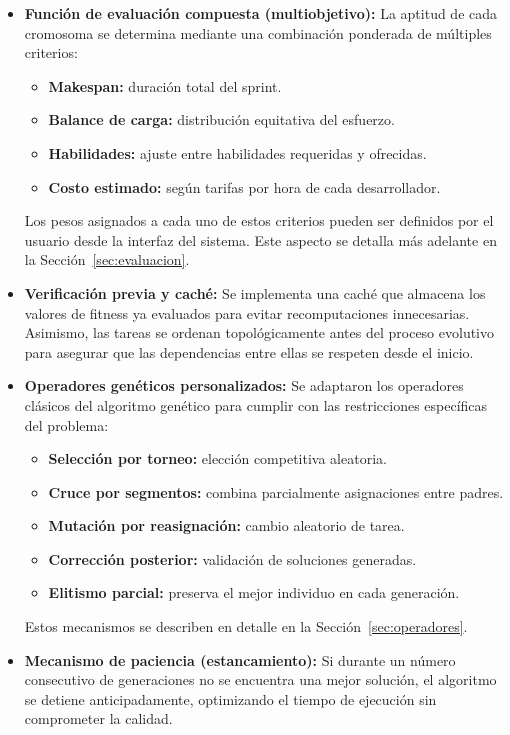 \begin{itemize}
    \item \textbf{Función de evaluación compuesta (multiobjetivo):}  
La aptitud de cada cromosoma se determina mediante una combinación ponderada de múltiples criterios:

\begin{itemize}
    \item \textbf{Makespan:} duración total del sprint.
    \item \textbf{Balance de carga:} distribución equitativa del esfuerzo.
    \item \textbf{Habilidades:} ajuste entre habilidades requeridas y ofrecidas.
    \item \textbf{Costo estimado:} según tarifas por hora de cada desarrollador.
\end{itemize}

Los pesos asignados a cada uno de estos criterios pueden ser definidos por el usuario desde la interfaz del sistema. Este aspecto se detalla más adelante en la Sección~\ref{sec:evaluacion}.

    \item \textbf{Verificación previa y caché:} Se implementa una caché que almacena los valores de fitness ya evaluados para evitar recomputaciones innecesarias. Asimismo, las tareas se ordenan topológicamente antes del proceso evolutivo para asegurar que las dependencias entre ellas se respeten desde el inicio.

    \item \textbf{Operadores genéticos personalizados:}  
Se adaptaron los operadores clásicos del algoritmo genético para cumplir con las restricciones específicas del problema:

\begin{itemize}
    \item \textbf{Selección por torneo:} elección competitiva aleatoria.
    \item \textbf{Cruce por segmentos:} combina parcialmente asignaciones entre padres.
    \item \textbf{Mutación por reasignación:} cambio aleatorio de tarea.
    \item \textbf{Corrección posterior:} validación de soluciones generadas.
    \item \textbf{Elitismo parcial:} preserva el mejor individuo en cada generación.
\end{itemize}

Estos mecanismos se describen en detalle en la Sección~\ref{sec:operadores}.

    \item \textbf{Mecanismo de paciencia (estancamiento):} Si durante un número consecutivo de generaciones no se encuentra una mejor solución, el algoritmo se detiene anticipadamente, optimizando el tiempo de ejecución sin comprometer la calidad.
\end{itemize}

